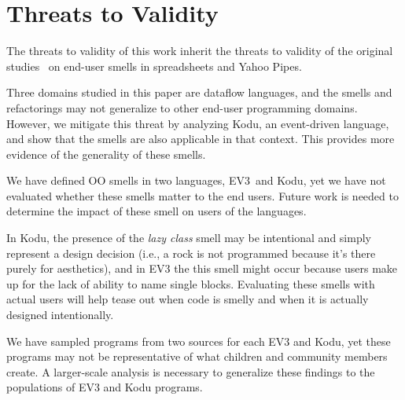 \documentclass{sig-alternate}
\begin{document}
%
%
%



\section{Threats to Validity}
\label{sec:threats}
The threats to validity of this work inherit the threats to validity of the original studies~\cite{Stolee2015, Stolee2011, StoleeTSE2013, Hermans2011, Hermans2012intra, Hermans2012inter} on end-user smells in spreadsheets and Yahoo Pipes.


Three domains studied in this paper are dataflow languages, and the smells and refactorings may not generalize to other end-user programming domains. However, we mitigate this threat by analyzing Kodu, an event-driven language, and show that the smells are also applicable in that context. This provides more evidence of the generality of these smells. 

We have defined OO smells in two languages, EV3~and Kodu, yet we have not evaluated whether these smells matter to the end users. Future work is needed to determine the impact of these smell on users of the languages. 

In Kodu, the presence of the \emph{lazy class} smell may be intentional and simply represent a design decision (i.e., a rock is not programmed because it's there purely for aesthetics), and in EV3 the this smell might occur because users make up for the lack of ability to name single blocks. Evaluating these smells with actual users will help tease out when code is smelly and when it is actually designed intentionally. 

We have sampled programs from two sources for each EV3 and Kodu, yet these programs may not be representative of what children and community members create. A larger-scale analysis is necessary to generalize these findings to the populations of EV3 and Kodu programs. 
\end{document}
